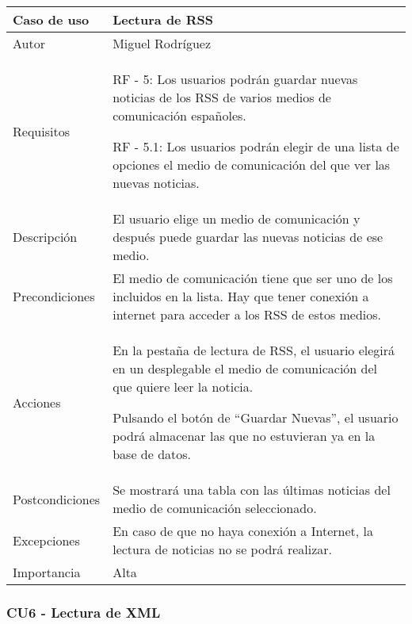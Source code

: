 \begin{center}
\begin{tabular}{ | m{3cm} | m{10cm}| } 
\hline
Caso de uso & Lectura de RSS \\ 
\hline
Autor & Miguel Rodríguez \\ 
\hline
Requisitos & RF - 5: Los usuarios podrán guardar nuevas noticias de 
los RSS de varios medios de comunicación españoles.

RF - 5.1: Los usuarios podrán elegir de una lista de opciones el medio de comunicación del que ver las nuevas noticias.
\\ 
\hline
Descripción & El usuario elige un medio de comunicación y después puede guardar las nuevas noticias de ese medio. \\
\hline
Precondiciones & El medio de comunicación tiene que ser uno de los incluidos en la lista. Hay que tener conexión a internet para acceder a los RSS de estos medios. \\
\hline
Acciones & En la pestaña de lectura de RSS, el usuario elegirá en un desplegable el medio de comunicación del que quiere leer la noticia.

Pulsando el botón de ``Guardar Nuevas'', el usuario podrá almacenar las que no estuvieran ya en la base de datos. \\
\hline
Postcondiciones & Se mostrará una tabla con las últimas noticias del medio de comunicación seleccionado. \\
\hline
Excepciones & En caso de que no haya conexión a Internet, la lectura de noticias no se podrá realizar. \\
\hline 
Importancia & Alta \\
\hline 
\end{tabular}
\end{center}

\subsubsection{CU6 - Lectura de XML}


